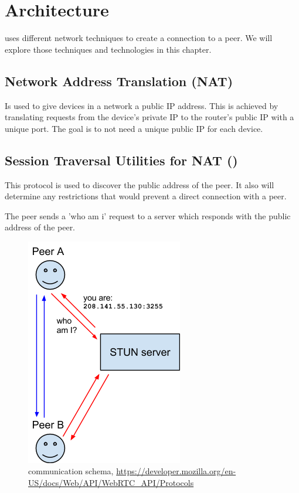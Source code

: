 \section{Architecture}
 uses different network techniques to create a connection to a peer. We will explore those techniques and technologies in this chapter.

\subsection{Network Address Translation (NAT)}
Is used to give devices in a network a public IP address. This is achieved by translating requests from the device's private IP to the router's public IP with a unique port. The goal is to not need a unique public IP for each device.

\subsection{Session Traversal Utilities for NAT ()}
This protocol is used to discover the public address of the peer. It also will determine any restrictions that would prevent a direct connection with a peer.

The peer sends a 'who am i' request to a  server which responds with the public address of the peer.

\begin{figure}[H]
	\includegraphics[scale=0.5]{images/webrtc-stun.png}
	\centering
	\caption{ communication schema, \url{https://developer.mozilla.org/en-US/docs/Web/API/WebRTC_API/Protocols}}
	\label{fig:STUN}
\end{figure}

